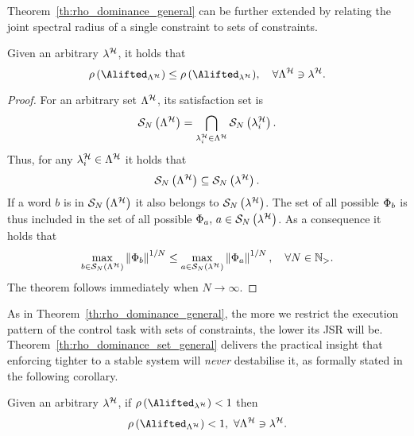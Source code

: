 Theorem~\ref{th:rho_dominance_general} can be further extended by relating the joint spectral radius of a single constraint to sets of constraints.
\begin{theorem}%
    \label{th:rho_dominance_set_general}%
    Given an arbitrary \ewhc{} $\lambda^{\mathcal{H}}$, it holds that
    $$
        \rho\,(\Alifted_{\Lambda^\strat}) \leq \rho \,( \Alifted_{\lambda^\strat} ) ,\quad \forall \Lambda^\strat \ni \lambda^\strat.
    $$
    \begin{proof}
        For an arbitrary \ewhc{} set $\Lambda^{\mathcal{H}}$, its satisfaction set is
        $$
            \mathcal{S}_{N}\left( \Lambda^{\mathcal{H}} \right) = \bigcap_{\lambda^{\mathcal{H}}_i \in \Lambda^{\mathcal{H}}} \mathcal{S}_{N}\left( \lambda^{\mathcal{H}}_i \right).
        $$
        Thus, for any $\lambda^{\mathcal{H}}_i \in \Lambda^{\mathcal{H}}$ it holds that 
        $$
            \mathcal{S}_{N}\left(  \Lambda^{\mathcal{H}}  \right) \subseteq \mathcal{S}_{N}\left( \lambda^{\mathcal{H}} \right).
        $$
        If a word $b$ is in $\mathcal{S}_{N}\left( \Lambda^{\mathcal{H}} \right)$ it also belongs to $\mathcal{S}_{N}\left( \lambda^{\mathcal{H}} \right)$. 
        The set of all possible $\Phi_{b}$ is thus included in the set of all possible $\Phi_{a},\, a \in \mathcal{S}_{N}\left( \lambda^{\mathcal{H}} \right)$.
        As a consequence it holds that
        \begin{equation*}
            \max_{b \in \mathcal{S}_{N}\left( \Lambda^{\mathcal{H}} \right)} \left\lVert\Phi_{b}\right\rVert^{1/N} \leq
            \max_{a \in \mathcal{S}_{N}\left( \lambda^{\mathcal{H}} \right)} \left\lVert\Phi_{a}\right\rVert^{1/N}, \quad
            \forall N \in \mathbb{N}_{>}.
        \end{equation*}
        The theorem follows immediately when $N\rightarrow \infty$.
    \end{proof}
\end{theorem}

As in Theorem~\ref{th:rho_dominance_general}, the more we restrict the execution pattern of the control task with sets of constraints, the lower its JSR will be.
%
Theorem~\ref{th:rho_dominance_set_general} delivers the practical insight that enforcing tighter \ewhc{} to a stable system will \emph{never} destabilise it, as formally stated in the following corollary.
\begin{corollary}%
    \label{cor:rho_dominance_set}%
    Given an arbitrary \ewhc{} $\lambda^{\mathcal{H}}$, if $\rho \,( \Alifted_{\lambda^\strat} ) < 1$ then
    $$
        \rho\,(\Alifted_{\Lambda^\strat}) < 1 ,\,\, \forall \Lambda^\strat \ni \lambda^\strat.
    $$
\end{corollary}
